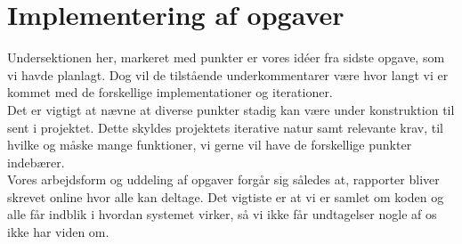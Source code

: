 \documentclass[12pt, a4paper]{article}
\begin{document}
    

\section{Implementering af opgaver}
Undersektionen her, markeret med punkter er vores idéer fra sidste opgave, som vi havde planlagt. Dog vil de tilstående underkommentarer være hvor langt vi er kommet med de forskellige implementationer og iterationer. \\ Det er vigtigt at nævne at diverse punkter stadig kan være under konstruktion til sent i projektet. Dette skyldes projektets iterative natur samt relevante krav, til hvilke og måske mange funktioner, vi gerne vil have de forskellige punkter indebærer. \newline \\
Vores arbejdsform og uddeling af opgaver forgår sig således at, rapporter bliver skrevet online hvor alle kan deltage. Det vigtiste er at vi er samlet om koden og alle får indblik i hvordan systemet virker, så vi ikke får undtagelser nogle af os ikke har viden om.
\end{document}

